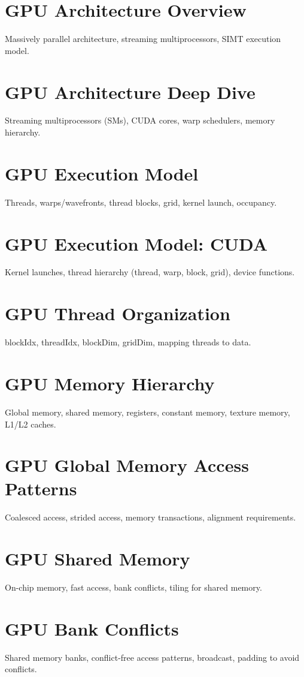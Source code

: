 \chapter{GPU Architecture Overview}
Massively parallel architecture, streaming multiprocessors, SIMT execution model.

\chapter{GPU Architecture Deep Dive}
Streaming multiprocessors (SMs), CUDA cores, warp schedulers, memory hierarchy.

\chapter{GPU Execution Model}
Threads, warps/wavefronts, thread blocks, grid, kernel launch, occupancy.

\chapter{GPU Execution Model: CUDA}
Kernel launches, thread hierarchy (thread, warp, block, grid), device functions.

\chapter{GPU Thread Organization}
blockIdx, threadIdx, blockDim, gridDim, mapping threads to data.

\chapter{GPU Memory Hierarchy}
Global memory, shared memory, registers, constant memory, texture memory, L1/L2 caches.

\chapter{GPU Global Memory Access Patterns}
Coalesced access, strided access, memory transactions, alignment requirements.

\chapter{GPU Shared Memory}
On-chip memory, fast access, bank conflicts, tiling for shared memory.

\chapter{GPU Bank Conflicts}
Shared memory banks, conflict-free access patterns, broadcast, padding to avoid conflicts.

